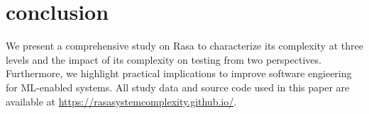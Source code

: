 
\section{conclusion}
\vspace{-3pt}


We present a comprehensive study on Rasa to characterize its complexity at three levels and the impact of its complexity on testing from two perspectives.
Furthermore, we highlight practical implications to improve software engieering for ML-enabled systems.
All study data and source code used in this paper are available at \url{https://rasasystemcomplexity.github.io/}.
